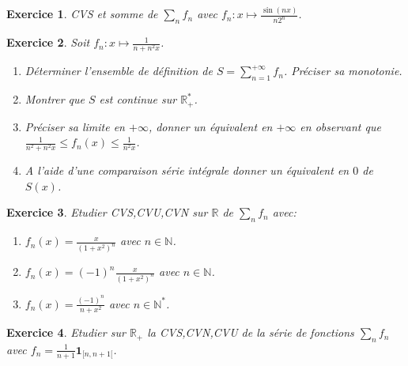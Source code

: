 \documentclass[12pt,a4paper]{article}
\newcommand{\R}{\mathbb{R}}
\newcommand{\N}{\mathbb{N}}
\newcommand{\E}{\mathrm{e}}
\theoremstyle{break}
\theoremstyle{break}
\newtheorem{Exo}{Exercice}
\begin{document}
\begin{Exo}
	CVS et somme de $\sum_n f_n$ avec $f_n:x\mapsto \frac{\sin(nx)}{n2^n}$.
\end{Exo}

\begin{Exo}
	Soit $f_n:x\mapsto \frac{1}{n+n^2x}$.
	\begin{enumerate}
		\item
		Déterminer l'ensemble de définition de $S=\sum_{n=1}^{+\infty}f_n$. Préciser sa monotonie.
		\item Montrer que $S$ est continue sur $\R_+^*$.
		\item Préciser sa limite en $+\infty$, donner un équivalent en $+\infty$ en observant que $\frac{1}{n^2+n^2x}\leqslant f_n(x)\leqslant \frac{1}{n^2x}$.
		\item A l'aide d'une comparaison série intégrale donner un équivalent en $0$ de $S(x)$.
	\end{enumerate}
\end{Exo}

%		



\begin{Exo}
	Etudier CVS,CVU,CVN sur $\R$ de $\sum_n f_n$ avec:
	\begin{enumerate}
		\item
		$f_n(x)=\frac{x}{\left(1+x^2\right)^n}$ avec $n\in\N$.
		\item
		$f_n(x)=(-1)^{n}\frac{x}{\left(1+x^2\right)^n}$ avec $n\in\N$.
		\item
		$f_n(x)=\frac{(-1)^n}{n+x^2}$ avec $n\in\N^*$.
	\end{enumerate}
	
\end{Exo}


\begin{Exo}
	Etudier sur $\R_+$ la CVS,CVN,CVU de la série de fonctions $\sum_n f_n$ avec $f_n=\frac{1}{n+1}\mathbf{1}_{[n,n+1[}$.
\end{Exo}
\end{document}
